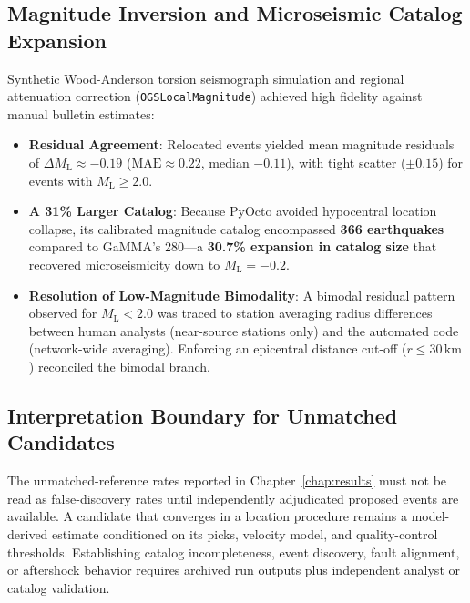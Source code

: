 \subsection{Magnitude Inversion and Microseismic Catalog Expansion}
Synthetic Wood-Anderson torsion seismograph simulation and regional
attenuation correction (\texttt{OGSLocalMagnitude}) achieved high
fidelity against manual bulletin estimates:
\begin{itemize}
  \item \textbf{Residual Agreement}: Relocated events yielded mean
    magnitude residuals of $\Delta M_{\mathrm{L}} \approx -0.19$
    ($\mathrm{MAE} \approx 0.22$, median $-0.11$), with tight
    scatter ($\pm 0.15$) for events with $M_{\mathrm{L}} \ge 2.0$.
  \item \textbf{A 31\% Larger Catalog}: Because PyOcto avoided
    hypocentral location collapse, its calibrated magnitude catalog
    encompassed \textbf{366 earthquakes} compared to GaMMA's 280---a
    \textbf{30.7\% expansion in catalog size} that recovered
    microseismicity down to $M_{\mathrm{L}} = -0.2$.
  \item \textbf{Resolution of Low-Magnitude Bimodality}: A bimodal
    residual pattern observed for $M_{\mathrm{L}} < 2.0$ was traced
    to station averaging radius differences between human analysts
    (near-source stations only) and the automated code (network-wide
    averaging). Enforcing an epicentral distance cut-off ($r \le
    30\,\unit{\kilo\meter}$) reconciled the bimodal branch.
\end{itemize}

\subsection{Interpretation Boundary for Unmatched Candidates}
The unmatched-reference rates reported in Chapter~\ref{chap:results}
must not be read as false-discovery rates until independently
adjudicated proposed events are available. A candidate that
converges in a location procedure remains a model-derived estimate
conditioned on its picks, velocity model, and quality-control
thresholds. Establishing catalog incompleteness, event discovery,
fault alignment, or aftershock behavior requires archived run
outputs plus independent analyst or catalog validation.

